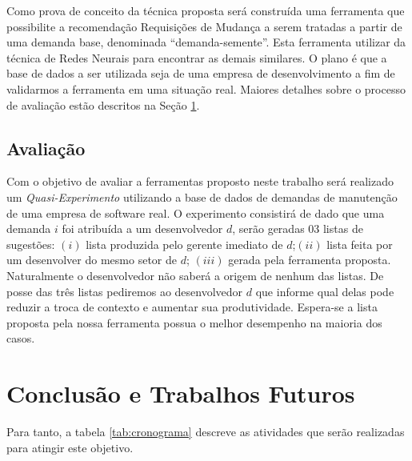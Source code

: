 \documentclass[msc,proposal,hidelot,hideabstract]{ppgccufmg} %
\begin{document}
Como prova de conceito da técnica proposta será construída uma ferramenta que
possibilite a recomendação Requisições de Mudança  a serem tratadas a partir de
uma demanda base, denominada ``demanda-semente''. Esta ferramenta utilizar da
técnica de Redes Neurais para encontrar as demais similares. O plano é que a
base de dados a ser utilizada seja de uma empresa de desenvolvimento a fim de validarmos
a ferramenta em uma situação real. Maiores detalhes sobre o processo de
avaliação estão descritos na Seção \ref{sec:avaliacao}.

\section{Avaliação}
\label{sec:avaliacao}

Com o objetivo de avaliar a ferramentas proposto neste trabalho será realizado um
\textit{Quasi-Experimento} \cite{wohlin2012experimentation} utilizando a base de dados de demandas de manutenção de uma empresa
de software real. O experimento consistirá de dado que uma demanda $i$ foi atribuída a um desenvolvedor $d$,
serão geradas 03 listas de sugestões: $(i)$ lista produzida pelo gerente imediato
de $d$;$(ii)$ lista feita por um desenvolver do mesmo setor de $d$; $(iii)$
gerada pela ferramenta proposta. Naturalmente o desenvolvedor não saberá a origem
de nenhum das listas.  De posse das três listas pediremos ao
desenvolvedor $d$ que informe qual delas pode reduzir a troca de contexto e
aumentar sua produtividade. Espera-se a lista proposta pela nossa ferramenta
possua o melhor desempenho na maioria dos casos.

\chapter{Conclusão e Trabalhos Futuros}
\label{ch:conclusao_trab_futuros}

Para tanto, a tabela \ref{tab:cronograma} descreve as atividades que serão realizadas para atingir este objetivo.
\end{document}
